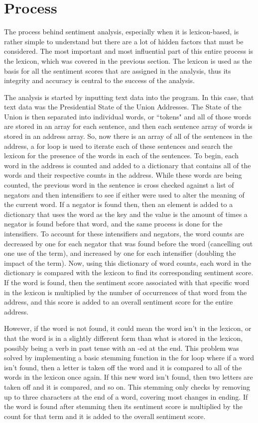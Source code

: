 \section{Process}
The process behind sentiment analysis, especially when it is lexicon-based, is rather simple to understand but there are a lot of hidden factors that must be considered.
The most important and most influential part of this entire process is the lexicon, which was covered in the previous section.
The lexicon is used as the basis for all the sentiment scores that are assigned in the analysis, thus its integrity and accuracy is central to the success of the analysis.

The analysis is started by inputting text data into the program. 
In this case, that text data was the Presidential State of the Union Addresses.
The State of the Union is then separated into individual words, or ``tokens" and all of those words are stored in an array for each sentence, and then each sentence array of words is stored in an address array.
So, now there is an array of all of the sentences in the address, a for loop is used to iterate each of these sentences and search the lexicon for the presence of the words in each of the sentences.
To begin, each word in the address is counted and added to a dictionary that contains all of the words and their respective counts in the address.
While these words are being counted, the previous word in the sentence is cross checked against a list of negators and then intensifiers to see if either were used to alter the meaning of the current word.
If a negator is found then, then an element is added to a dictionary that uses the word as the key and the value is the amount of times a negator is found before that word, and the same process is done for the intensifiers.
To account for these intensifiers and negators, the word counts are decreased by one for each negator that was found before the word (cancelling out one use of the term), and increased by one for each intensifier (doubling the impact of the term).
Now, using this dictionary of word counts, each word in the dictionary is compared with the lexicon to find its corresponding sentiment score.
If the word is found, then the sentiment score associated with that specific word in the lexicon is multiplied by the number of occurrences of that word from the address, and this score is added to an overall sentiment score for the entire address.

However, if the word is not found, it could mean the word isn't in the lexicon, or that the word is in a slightly different form than what is stored in the lexicon, possibly being a verb in past tense with an -ed at the end.
This problem was solved by implementing a basic stemming function in the for loop where if a word isn't found, then a letter is taken off the word and it is compared to all of the words in the lexicon once again.
If this new word isn't found, then two letters are taken off and it is compared, and so on.
This stemming only checks by removing up to three characters at the end of a word, covering most changes in ending.
If the word is found after stemming then its sentiment score is multiplied by the count for that term and it is added to the overall sentiment score.

